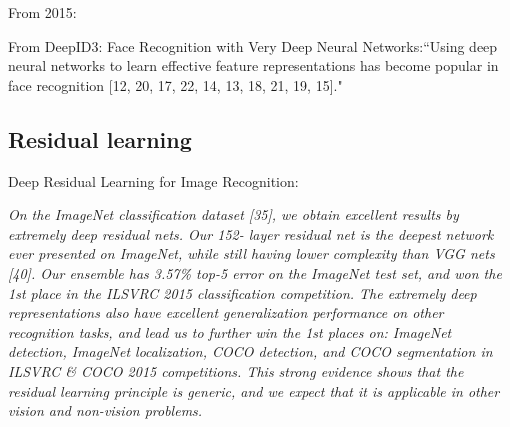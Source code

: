 \documentclass[12pt]{llncs}
\begin{document}
From 2015:



From DeepID3: Face Recognition with Very Deep Neural Networks:``Using deep neural networks to learn effective feature
representations has become popular in face recognition
[12, 20, 17, 22, 14, 13, 18, 21, 19, 15]."

\subsection{Residual learning}

Deep Residual Learning for Image Recognition:

\emph{On the ImageNet classification dataset [35], we obtain
excellent results by extremely deep residual nets. Our 152-
layer residual net is the deepest network ever presented on
ImageNet, while still having lower complexity than VGG
nets [40]. Our ensemble has 3.57\% top-5 error on the
ImageNet test set, and won the 1st place in the ILSVRC
2015 classification competition. The extremely deep representations
also have excellent generalization performance
on other recognition tasks, and lead us to further win the
1st places on: ImageNet detection, ImageNet localization,
COCO detection, and COCO segmentation in ILSVRC \&
COCO 2015 competitions. This strong evidence shows that
the residual learning principle is generic, and we expect that
it is applicable in other vision and non-vision problems.}
\end{document}
